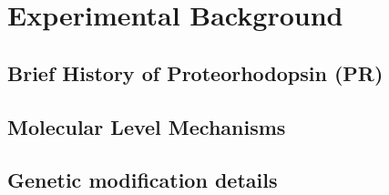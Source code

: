 

\chapter{Experimental Background}
\label{experimental-background}


\section{Brief History of Proteorhodopsin (PR)}
\label{brief-history-of-proteorhodopsin}

\section{Molecular Level Mechanisms}
\label{molecular-level-mechanisms}

\section{Genetic modification details}
\label{genetic-modification-details}
